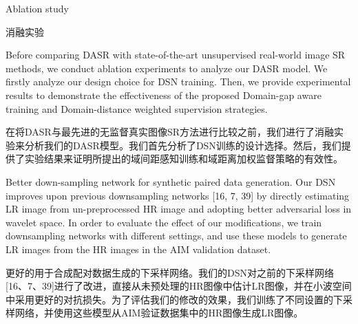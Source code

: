 Ablation study

消融实验

Before comparing DASR with state-of-the-art unsupervised real-world image SR methods, we conduct ablation experiments to analyze our DASR model. We firstly analyze our design choice for DSN training. Then, we provide experimental results to demonstrate the effectiveness of the proposed Domain-gap aware training and Domain-distance weighted supervision strategies.

在将DASR与最先进的无监督真实图像SR方法进行比较之前，我们进行了消融实验来分析我们的DASR模型。我们首先分析了DSN训练的设计选择。然后，我们提供了实验结果来证明所提出的域间距感知训练和域距离加权监督策略的有效性。

Better down-sampling network for synthetic paired data generation. Our DSN improves upon previous downsampling networks [16, 7, 39] by directly estimating LR image from un-preprocessed HR image and adopting better adversarial loss in wavelet space. In order to evaluate the effect of our modifications, we train downsampling networks with different settings, and use these models to generate LR images from the HR images in the AIM validation dataset.

更好的用于合成配对数据生成的下采样网络。我们的DSN对之前的下采样网络[16、7、39]进行了改进，直接从未预处理的HR图像中估计LR图像，并在小波空间中采用更好的对抗损失。为了评估我们的修改的效果，我们训练了不同设置的下采样网络，并使用这些模型从AIM验证数据集中的HR图像生成LR图像。